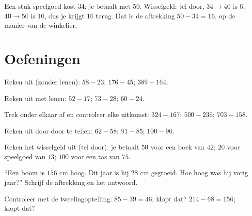 \begin{example}\label{ex:g2:subtraction:change}
Een stuk speelgoed kost $34$; je betaalt met $50$. Wisselgeld: tel door,
$34 \to 40$ is $6$, $40 \to 50$ is $10$, dus je krijgt $16$ terug. Dat
is de aftrekking $50 - 34 = 16$, op de manier van de winkelier.
\end{example}

\section{Oefeningen}

\begin{exercise}[$\star$]\label{exo:g2:subtraction:1}
Reken uit (zonder lenen): $58 - 23$; \quad $176 - 45$; \quad
$389 - 164$.
\end{exercise}

\begin{exercise}[$\star$]\label{exo:g2:subtraction:2}
Reken uit met lenen: $52 - 17$; \quad $73 - 28$; \quad $60 - 24$.
\end{exercise}

\begin{exercise}[$\star$]\label{exo:g2:subtraction:3}
Trek onder elkaar af en controleer elke uitkomst: $324 - 167$; \quad
$500 - 236$; \quad $703 - 158$.
\end{exercise}

\begin{exercise}[$\star$]\label{exo:g2:subtraction:4}
Reken uit door door te tellen: $62 - 58$; \quad $91 - 85$; \quad
$100 - 96$.
\end{exercise}

\begin{exercise}[$\star$]\label{exo:g2:subtraction:5}
Reken het wisselgeld uit (tel door): je betaalt $50$ voor een boek van
$42$; $20$ voor speelgoed van $13$; $100$ voor een tas van $75$.
\end{exercise}

\begin{exercise}[$\star$]\label{exo:g2:subtraction:6}
``Een boom is $156$ cm hoog. Dit jaar is hij $28$ cm gegroeid. Hoe hoog
was hij vorig jaar?'' Schrijf de aftrekking en het antwoord.
\end{exercise}

\begin{exercise}[$\star$]\label{exo:g2:subtraction:7}
Controleer met de tweelingoptelling: $85 - 39 = 46$; klopt dat?
$214 - 68 = 156$; klopt dat?
\end{exercise}


